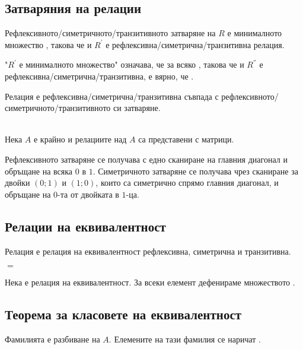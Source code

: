 \subsection{Затваряния на релации}
Рефлексивното/симетричното/транзитивното затваряне на \(R\) е минималното множество , 
такова че  и \(R^{'}\) е рефлексивна/симетрична/транзитивна релация.

"\(R^{'}\) е минималното множество" означава, че за всяко , такова че 
 и \(R^{''}\) е рефлексивна/симетрична/транзитивна, е вярно, че .

Релация е рефлексивна/симетрична/транзитивна \totw съвпада с рефлексивното/симетричното/транзитивното си 
затваряне.

 \\
Нека \(A\) е крайно и релациите над \(A\) са представени с матрици.

Рефлексивното затваряне се получава с едно сканиране на главния диагонал и обръщане на всяка \(0\) в \(1\).
Симетричното затваряне се получава чрез сканиране за двойки \((0; 1)\) и \((1; 0)\), които са симетрично
спрямо главния диагонал, и обръщане на \(0\)-та от двойката в \(1\)-ца.

\subsection{Релации на еквивалентност}
Релация е релация на еквивалентност \totw рефлексивна, симетрична и транзитивна.

 \(=\)

Нека  е релация на еквивалентност. За всеки елемент  дефенираме
множеството .

\subsection{Теорема за класовете на еквивалентност}
Фамилията  е разбиване на \(A\). Елемените на тази фамилия се наричат 
.

